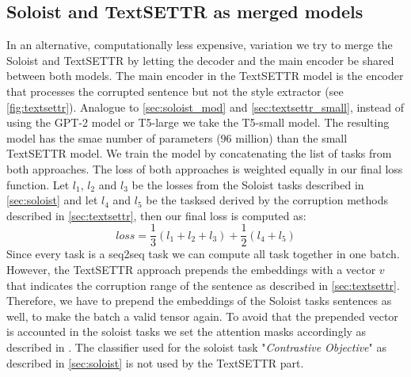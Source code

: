 \documentclass[twocolumn]{tum-article}
\begin{document}
\subsection{Soloist and TextSETTR as merged models}
In an alternative, computationally less expensive, variation we try to merge the Soloist and TextSETTR by letting the decoder and the main encoder be shared between both models. The main encoder in the TextSETTR model is the encoder that processes the corrupted sentence but not the style extractor (see \autoref{fig:textsettr}). Analogue to \autoref{sec:soloist_mod} and \autoref{sec:textsettr_small}, instead of using the GPT-2 model or T5-large we take the T5-small model. The resulting model has the smae number of parameters ($96$ million) than the small TextSETTR model. We train the model by concatenating the list of tasks from both approaches. The loss of both approaches is weighted equally in our final loss function. Let $l_1$, $l_2$ and $l_3$ be the losses from the Soloist tasks described in \autoref{sec:soloist} and let $l_4$ and $l_5$ be the tasksed derived by the corruption methods described in \autoref{sec:textsettr}, then our final loss is computed as:
$$
loss = \frac{1}{3}(l_1 + l_2 + l_3) + \frac{1}{2} (l_4 + l_5)
$$
Since every task is a seq2seq task we can compute all task together in one batch. However, the TextSETTR approach prepends the embeddings with a vector $v$ that indicates the corruption range of the sentence as described in \autoref{sec:textsettr}. Therefore, we have to prepend the embeddings of the Soloist tasks sentences as well, to make the batch a valid tensor again. To avoid that the prepended vector is accounted in the soloist tasks we set the attention masks accordingly as described in \cite{vaswani2017attention}. The classifier used for the soloist task "\textit{Contrastive Objective}" as described in \autoref{sec:soloist} is not used by the TextSETTR part.
\end{document}
